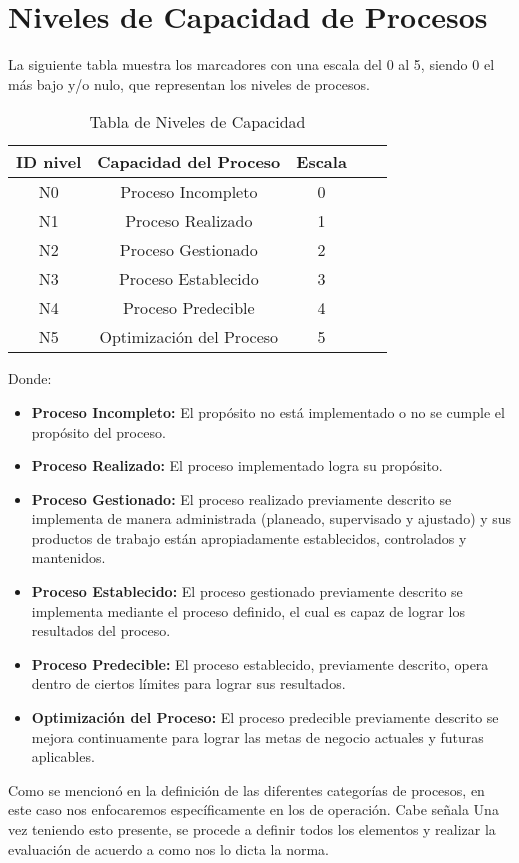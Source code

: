 \section{Niveles de Capacidad de Procesos}
La siguiente tabla muestra los marcadores con una escala del 0 al 5, siendo 0 el más bajo y/o nulo, que representan los niveles de procesos. 

\begin{table}[h]
	\begin{center}
		\begin{tabular}{|c|c|c|c|c|}
			\hline 
			\textbf{ID nivel} & \textbf{Capacidad del Proceso} & \textbf{Escala} \\ 
			\hline 
			N0&Proceso Incompleto&0\\
			N1&Proceso Realizado&1\\
			N2&Proceso Gestionado&2\\
			N3&Proceso Establecido&3\\
			N4&Proceso Predecible&4\\
			N5&Optimización del Proceso&5\\
			\hline 
		\end{tabular}
	\end{center}
	\label{tab: Tabla de Niveles de Capacidad}
	\caption{Tabla de Niveles de Capacidad}
\end{table}
Donde:
\begin{itemize}
	\item \textbf{Proceso Incompleto: } El propósito no está implementado o no se cumple el propósito del proceso.
	\item \textbf{Proceso Realizado: } El proceso implementado logra su propósito.
	\item \textbf{Proceso Gestionado: } El proceso realizado previamente descrito se implementa de manera administrada (planeado, supervisado y ajustado) y sus productos de trabajo están apropiadamente establecidos,
	controlados y mantenidos.
	\item \textbf{Proceso Establecido: } El proceso gestionado previamente descrito se implementa mediante el proceso definido, el cual es capaz de lograr los resultados del proceso.
	\item \textbf{Proceso Predecible: } El proceso establecido, previamente descrito, opera dentro de ciertos límites para lograr sus resultados.
	\item \textbf{Optimización del Proceso: } El proceso predecible previamente descrito se mejora continuamente para lograr las metas de negocio actuales y futuras aplicables. 
\end{itemize}
Como se mencionó en la definición de las diferentes categorías de procesos, en este caso nos enfocaremos específicamente en los de operación. Cabe señala Una vez teniendo esto presente, se procede a definir todos los elementos y realizar la evaluación de acuerdo a como nos lo dicta la norma.




